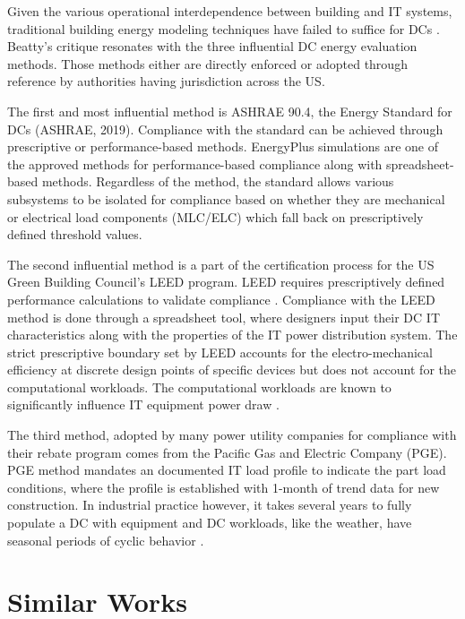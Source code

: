 {Given the various operational interdependence between building and IT systems, traditional building energy modeling techniques have failed to suffice for DCs \citep{Beatty15}. Beatty's critique resonates with the three influential DC energy evaluation methods. Those methods either are directly enforced or adopted through reference by authorities having jurisdiction across the US. 

The first and most influential method is ASHRAE 90.4, the Energy Standard for DCs (ASHRAE, 2019). Compliance with the standard can be achieved through prescriptive or performance-based methods. EnergyPlus simulations are one of the approved methods for performance-based compliance along with spreadsheet-based methods. Regardless of the method, the standard allows various subsystems to be isolated for compliance based on whether they are mechanical or electrical load components (MLC/ELC) which fall back on prescriptively defined threshold values.

The second influential method is a part of the certification process for the US Green Building Council's LEED program. LEED requires prescriptively defined performance calculations to validate compliance \citep{LEED16}. Compliance with the LEED method is done through a spreadsheet tool, where designers input their DC IT characteristics along with the properties of the IT power distribution system. The strict prescriptive boundary set by LEED accounts for the electro-mechanical efficiency at discrete design points of specific devices but does not account for the computational workloads. The computational workloads are known to significantly influence IT equipment power draw \citep{marculescu20}.  

The third method, adopted by many power utility companies for compliance with their rebate program comes from the Pacific Gas and Electric Company (PGE). PGE method mandates an documented IT load profile to indicate the part load conditions, where the profile is established with 1-month of trend data for new construction. In industrial practice however, it takes several years to fully populate a DC with equipment and DC workloads, like the weather, have seasonal periods of cyclic behavior \citep{zhuang15}.}

\section*{Similar Works}

